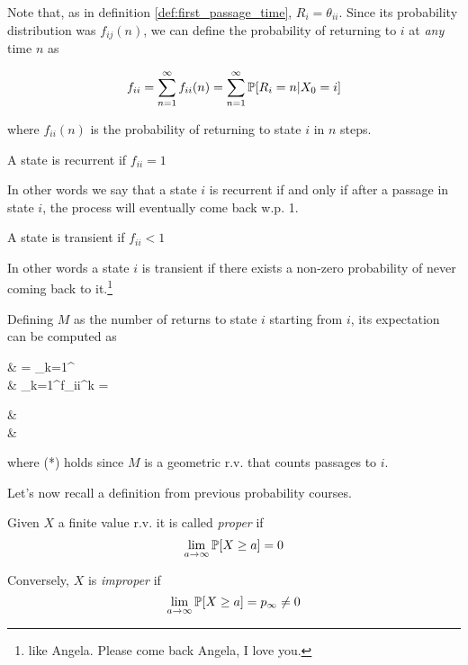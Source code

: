 	Note that, as in definition \ref{def:first_passage_time}, $R_i = \theta_{ii}$.
	Since its probability distribution was $f_{ij}(n)$, we can define the probability of returning to $i$ at \emph{any} time $n$ as

	$$ f_{ii} = \sum_{n=1}^\infty f_{ii}(n)  = \sum_{n=1}^\infty \mathbb{P}[R_i=n | X_0=i] $$

	where $f_{ii}(n)$ is the probability of returning to state $i$ in $n$ steps.

	\begin{definition}
		A state is recurrent if $f_{ii} = 1$
	\end{definition}
	In other words we say that a state $i$ is recurrent if and only if after a passage in state $i$, the process will eventually come back w.p. 1.

	\begin{definition}
		A state is transient if  $f_{ii} < 1$
	\end{definition}

	In other words a state $i$ is transient if there exists a non-zero probability of never coming back to it.\footnote{like Angela. Please come back Angela, I love you.}

	\begin{definition} \label{def:big_m}
		Defining $M$ as the number of returns to state $i$ starting from $i$, its expectation can be computed as

		\begin{esp}
			\exp[M | X_0 = i]
			& = \sum_{k=1}^\infty \prob[M\geq k | X_0 = i] \\
			& \stackrel{(*)}{=} \sum_{k=1}^\infty f_{ii}^k
				= \begin{dcases}
						 &  \\
						\infty & 
					\end{dcases}
		\end{esp}
		where (*) holds since $M$ is a geometric r.v. that counts passages to $i$.
	\end{definition}

	\bigbreak
	Let's now recall a definition from previous probability courses.
	\begin{definition}
		Given $X$ a finite value r.v. it is called \emph{proper} if
		$$\lim_{a\to \infty} \mathbb{P}[X\geq a] = 0$$

		Conversely, $X$ is \emph{improper} if
		$$\lim_{a\to \infty} \mathbb{P}[X\geq a] = p_\infty \ne 0$$
	\end{definition}


